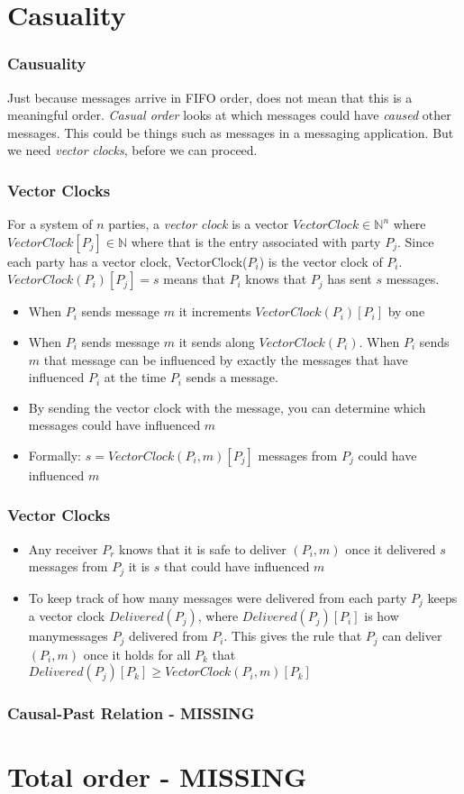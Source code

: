 \documentclass[14pt]{beamer}
\newcommand{\N}{\mathbb{N}}
\begin{document}
\section{Casuality}
    \begin{frame}
        \frametitle{Causuality}
            Just because messages arrive in FIFO order, does not mean that this is a meaningful order. \textit{Casual order} looks at which messages could have \textit{caused} other messages. This could be things such as messages in a messaging application. But we need \textit{vector clocks}, before we can proceed. 
    \end{frame}
    \begin{frame}
        \frametitle{Vector Clocks}
            For a system of $n$ parties, a \textit{vector clock} is a vector $VectorClock \in \N^n$ where $VectorClock[P_j] \in \N$ where that is the entry associated with party $P_j$. Since each party has a vector clock, VectorClock($P_i$) is the vector clock of $P_i$.
            $VectorClock(P_i)[P_j] = s$ means that $P_i$ knows that $P_j$ has sent $s$ messages. 
            \begin{itemize}
                \item When $P_i$ sends message $m$ it increments $VectorClock(P_i)[P_i]$ by one
                \item When $P_i$ sends message $m$ it sends along $VectorClock(P_i)$. When $P_i$ sends $m$ that message can be influenced by exactly the messages that have influenced $P_i$ at the time $P_i$ sends a message. 
                \item By sending the vector clock with the message, you can determine which messages could have influenced $m$
                \item Formally: $s = VectorClock(P_i, m)[P_j]$ messages from $P_j$ could have influenced $m$
            \end{itemize}
    \end{frame}

    \begin{frame}
        \frametitle{Vector Clocks}
            \begin{itemize}
                \item Any receiver $P_r$ knows that it is safe to deliver $(P_i, m)$ once it delivered $s$ messages from $P_j$ it is $s$ that could have influenced $m$
                \item To keep track of how many messages were delivered from each party $P_j$ keeps a vector clock $Delivered(P_j)$, where $Delivered(P_j)[P_i]$ is how manymessages $P_j$ delivered from $P_i$. This gives the rule that $P_j$ can deliver $(P_i, m)$ once it holds for all $P_k$ that $Delivered(P_j)[P_k] \geq VectorClock(P_i, m)[P_k]$
            \end{itemize}
    \end{frame}

    \begin{frame}
        \frametitle{Causal-Past Relation - MISSING}
                
        
    
    \end{frame}
\section{Total order - MISSING}
\end{document}
